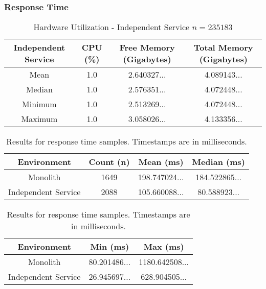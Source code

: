 \subsubsection{Response Time}
\begin{table}[h!]
       \begin{tabular}{|c|c|c|c|} 
        \hline
        Independent Service
        & CPU (\%)
        & Free Memory (Gigabytes)
        & Total Memory (Gigabytes) \\ [0.5ex] 
        
        \hline\hline
        Mean
        & 1.0
        & 2.640327...
        & 4.089143... \\ 
        
        Median
        & 1.0
        & 2.576351...
        & 4.072448... \\ 

        Minimum
        & 1.0
        & 2.513269...
        & 4.072448...\\ 
        
        Maximum
        & 1.0
        & 3.058026...
        & 4.133356... \\
        \hline
    \end{tabular}
    \caption{Hardware Utilization - Independent Service $n=235183$}
    \label{table:hardware results:independent service:1}
\end{table}

\begin{table}[h!]
    \begin{tabular}{|c|c|c|c|} 
        \hline
        Environment
        & Count (n)
        & Mean (ms)
        & Median (ms) \\ [0.5ex] 
        
        \hline\hline
        Monolith
        & 1649
        & 198.747024...
        & 184.522865...\\ 
        
        Independent Service
        & 2088
        & 105.660088...
        & 80.588923... \\
        \hline
    \end{tabular}
    \caption{Results for response time samples. Timestamps are in milliseconds.}
    \label{table:response time results:1}
\end{table}

\begin{table}[h!]
    \begin{tabular}{|c|c|c|} 
        \hline
        Environment
        & Min (ms)
        & Max (ms) \\ [0.5ex] 
        
        \hline\hline
        Monolith
        & 80.201486... 
        & 1180.642508... \\ 
        
        Independent Service
        & 26.945697... 
        & 628.904505...  \\
        \hline
    \end{tabular}
    \caption{Results for response time samples. Timestamps are in milliseconds.}
    \label{table:response time results:2}
\end{table}

